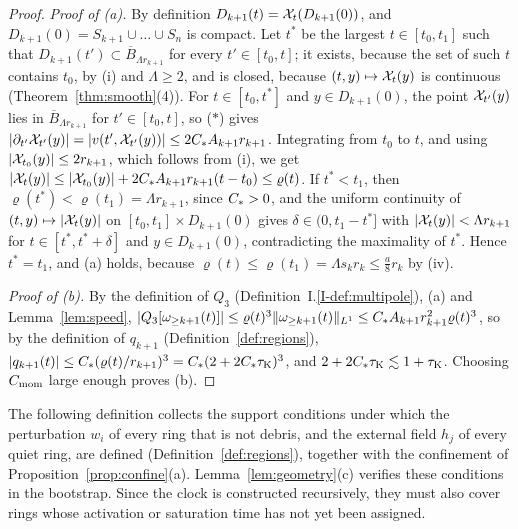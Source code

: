 \begin{proof}
\emph{Proof of (a).} By definition $D_{k+1}(t)=\mathcal{X}_t(D_{k+1}(0))$, and
$D_{k+1}(0)=S_{k+1}\cup\dots\cup S_n$ is compact. Let $t^*$ be the largest
$t\in[t_0,t_1]$ such that $D_{k+1}(t')\subset\overline B_{\Lambda r_{k+1}}$ for
every $t'\in[t_0,t]$; it exists, because the set of such $t$ contains $t_0$, by
(i) and $\Lambda\ge2$, and is closed, because $(t,y)\mapsto\mathcal{X}_t(y)$ is
continuous (Theorem~\ref{thm:smooth}\textup{(4)}). For $t\in[t_0,t^*]$ and
$y\in D_{k+1}(0)$, the point $\mathcal{X}_{t'}(y)$ lies in $\overline B_{\Lambda r_{k+1}}$
for $t'\in[t_0,t]$, so \textup{($*$)} gives
$|\partial_{t'}\mathcal{X}_{t'}(y)|=|v(t',\mathcal{X}_{t'}(y))|\le2C_{*} A_{k+1}r_{k+1}$.
Integrating from $t_0$ to $t$, and using $|\mathcal{X}_{t_0}(y)|\le2r_{k+1}$, which
follows from (i), we get
$|\mathcal{X}_t(y)|\le|\mathcal{X}_{t_0}(y)|+2C_{*} A_{k+1}r_{k+1}(t-t_0)\le\varrho(t)$. If
$t^*<t_1$, then $\varrho(t^*)<\varrho(t_1)=\Lambda r_{k+1}$, since $C_{*}>0$, and
the uniform continuity of $(t,y)\mapsto|\mathcal{X}_t(y)|$ on
$[t_0,t_1]\times D_{k+1}(0)$ gives $\delta\in(0,t_1-t^*]$ with
$|\mathcal{X}_t(y)|<\Lambda r_{k+1}$ for $t\in[t^*,t^*+\delta]$ and $y\in D_{k+1}(0)$,
contradicting the maximality of $t^*$. Hence $t^*=t_1$, and (a) holds, because
$\varrho(t)\le\varrho(t_1)=\Lambda s_kr_k\le\frac a8r_k$ by (iv).

\emph{Proof of (b).} By the definition of $Q_3$
(Definition~I.\ref{I-def:multipole}), (a) and Lemma~\ref{lem:speed},
$|Q_3[\omega_{\ge k+1}(t)]|\le\varrho(t)^3\|\omega_{\ge k+1}(t)\|_{L^1}\le C_{*} A_{k+1}r_{k+1}^2\allowbreak\varrho(t)^3$,
so by the definition of $q_{k+1}$ (Definition~\ref{def:regions}),
$|q_{k+1}(t)|\le C_{*}(\varrho(t)/r_{k+1})^3=C_{*}(2+2C_{*}\tau_{\mathrm{K}})^3$, and
$2+2C_{*}\tau_{\mathrm{K}}\lesssim1+\tau_{\mathrm{K}}$. Choosing $C_{\mathrm{mom}}$ large enough proves (b).
\end{proof}

The following definition collects the support conditions under which the
perturbation $w_i$ of every ring that is not debris, and the external field
$h_j$ of every quiet ring, are defined (Definition~\ref{def:regions}), together
with the confinement of
Proposition~\ref{prop:confine}\textup{(a)}.
Lemma~\ref{lem:geometry}\textup{(c)} verifies these conditions in the bootstrap.
Since the clock is constructed recursively, they
must also cover rings whose activation or saturation time has not yet been
assigned.

